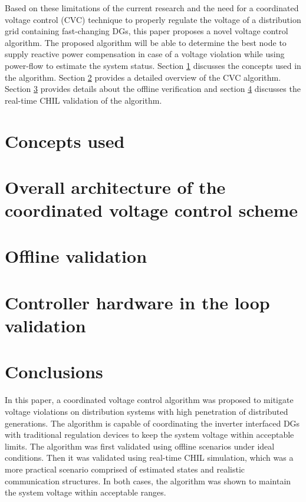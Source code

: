 \documentclass[Journal]{IEEEtran}
\begin{document}
Based on these limitations of the current research and the need for a coordinated voltage control (CVC) technique to properly regulate the voltage of a distribution grid containing fast-changing DGs, this paper proposes a novel voltage control algorithm. The proposed algorithm will be able to determine the best node to supply reactive power compensation in case of a voltage violation while using power-flow to estimate the system status. Section \ref{CU} discusses the concepts used in the algorithm. Section \ref{CVC} provides a detailed overview of the CVC algorithm. Section \ref{off1} provides details about the offline verification and section \ref{chil} discusses the real-time CHIL validation of the algorithm.
\section{Concepts used}
\label{CU}


\section{Overall architecture of the coordinated voltage control scheme} \label{CVC}


\section{Offline validation}
\label{off1}


\section{Controller hardware in the loop validation}\label{chil}


\section{Conclusions}
In this paper, a coordinated voltage control algorithm was proposed to mitigate voltage violations on distribution systems with high penetration of distributed generations. The algorithm is capable of coordinating the inverter interfaced DGs with traditional regulation devices to keep the system voltage within acceptable limits. The algorithm was first validated using offline scenarios under ideal conditions. Then it was validated using real-time CHIL simulation, which was a more practical scenario comprised of estimated states and realistic communication structures. In both cases, the algorithm was shown to maintain the system voltage within acceptable ranges. 



\end{document}
